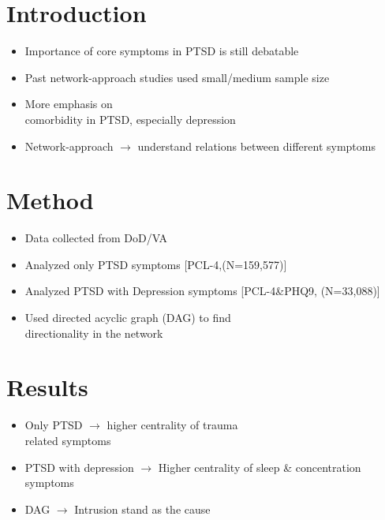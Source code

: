 \documentclass[]{betterposter}
\begin{document}
{

\section{Introduction}
\begin{itemize}
\item Importance of core symptoms in PTSD is still debatable
\item Past network-approach studies used small/medium sample size
\item More emphasis on\\ comorbidity in PTSD, especially depression
\item Network-approach $\rightarrow$ understand relations between different symptoms
\end{itemize}

\section{Method}
\begin{itemize}
\item Data collected from DoD/VA
\item Analyzed only PTSD symptoms [PCL-4,(N=159,577)]
\item Analyzed PTSD with Depression symptoms [PCL-4\&PHQ9, (N=33,088)]
\item Used directed acyclic graph (DAG) to find \\directionality in the network
\end{itemize}


\section{Results}
\begin{itemize}
    \item Only PTSD $\rightarrow$ higher centrality of trauma\\ related symptoms
    \item PTSD with depression $\rightarrow$ Higher centrality of sleep \& concentration symptoms
    \item DAG $\rightarrow$ Intrusion stand as the cause
\end{itemize}

}
\end{document}
